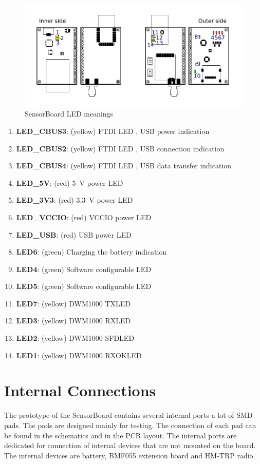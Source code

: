 \begin{figure}[H]
	\centering
	\includegraphics[scale=1]{img/LEDmeanings.pdf}
	\caption{SensorBoard LED meanings}
	\label{fig:LEDmeaning}
\end{figure}

\begin{enumerate}
	\setlength\itemsep{0.2em}
	\item \textbf{LED\_CBUS3}: (yellow) FTDI LED \cite{ftdichip:FT232R}, \ac{USB} power indication
	\item \textbf{LED\_CBUS2}: (yellow) FTDI LED \cite{ftdichip:FT232R}, \ac{USB} connection indication
	\item \textbf{LED\_CBUS4}: (yellow) FTDI LED \cite{ftdichip:FT232R}, \ac{USB} data transfer indication
	\item \textbf{LED\_5V}: (red) \SI{5}{V} power LED
	\item \textbf{LED\_3V3}: (red) \SI{3.3}{V} power LED
	\item \textbf{LED\_VCCIO}: (red) VCCIO power LED
	\item \textbf{LED\_USB}: (red) \ac{USB} power LED
	\item \textbf{LED6}: (green) Charging the battery indication
	\item \textbf{LED4}: (green) Software configurable LED
	\item \textbf{LED5}: (green) Software configurable LED
	\item \textbf{LED7}: (yellow) DWM1000 TXLED \cite{decawave:DWM1000}
	\item \textbf{LED3}: (yellow) DWM1000 RXLED \cite{decawave:DWM1000}
	\item \textbf{LED2}: (yellow) DWM1000 SFDLED \cite{decawave:DWM1000}
	\item \textbf{LED1}: (yellow) DWM1000 RXOKLED \cite{decawave:DWM1000}
\end{enumerate}

\section{Internal Connections}
The prototype of the SensorBoard contains several internal ports a lot of \ac{SMD} pads. The pads are designed mainly for testing. The connection of each pad can be found in the schematics and in the \ac{PCB} layout. The internal ports are dedicated for connection of internal devices that are not mounted on the board. The internal devices are battery, BMF055 \cite{bosch:BMF055} extension board and HM-TRP \cite{HM-TRP} radio.

